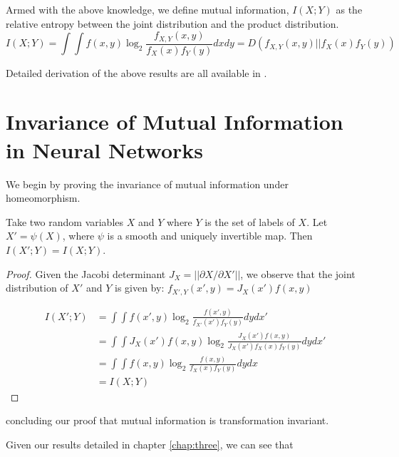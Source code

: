 Armed with the above knowledge, we define mutual information, $I(X; Y)$ as the relative entropy between the joint distribution and the product distribution.
$$I(X; Y) = \int \int f(x, y) \log_2 \frac{f_{X,Y}(x, y)}{f_{X}(x) f_{Y}(y)} dx dy = D(f_{X,Y}(x, y)||f_{X}(x)f_{Y}(y))$$

Detailed derivation of the above results are all available in \cite{coverthomas2006}.

\section{Invariance of Mutual Information in Neural Networks}

We begin by proving the invariance of mutual information under homeomorphism.

\begin{theorem}
Take two random variables $X$ and $Y$ where $Y$ is the set of labels of $X$.
Let $X' = \psi(X)$, where $\psi$ is a smooth and uniquely invertible map.
Then $I(X'; Y) = I(X; Y)$.
\end{theorem}

\begin{proof}
Given the Jacobi determinant $J_X = ||\partial X/ \partial X'||$, we observe that the joint distribution of $X'$ and $Y$ is given by: $f_{X', Y}(x', y) = J_X(x')f(x, y)$

\begin{align*}
I(X'; Y) & = \int \int f(x', y) \log_2 \frac{f(x', y)}{f_{X'}(x') f_{Y}(y)} dy dx'\\
& = \int \int J_X(x')f(x, y) \log_2 \frac{J_X(x')f(x, y)}{J_X(x')f_{X}(x)f_{Y}(y)} dy dx'\\
& = \int \int f(x, y) \log_2 \frac{f(x, y)}{f_{X}(x) f_{Y}(y)} dy dx \\
& = I(X; Y)
\end{align*}
\end{proof}
concluding our proof that mutual information is transformation invariant. 



Given our results detailed in chapter \ref{chap:three}, we can see that 